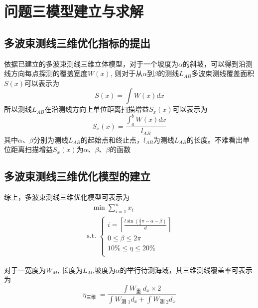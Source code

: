 \documentclass[withoutpreface,bwprint]{cumcmthesis} %
\begin{document}
    \section{问题三模型建立与求解}
    \subsection{多波束测线三维优化指标的提出}
    依据已建立的多波束测线三维立体模型，对于一个坡度为$\alpha$的斜坡，可以得到沿测线方向每点探测的覆盖宽度$W(x)$, 则对于从$\alpha$到$\beta$的测线$L_{AB}$多波束测线覆盖面积$S(x)$可以表示为
    \begin{equation}
        S(x)=\int W(x) d x
    \end{equation}
    所以测线$L_{AB}$在沿测线方向上单位距离扫描增益$S_x(x)$可以表示为
    \begin{equation}
        S_x(x)=\frac{\int_a^b W(x) d x}{l_{AB}}
    \end{equation}
   其中$\alpha$、$\beta$分别为测线$L_{AB}$的起始点和终止点，$l_{AB}$为测线$L_{AB}$的长度。不难看出单位距离扫描增益$S_x(x)$为$\alpha$、$\beta$、$\beta$的函数
  

   
   \subsection{多波束测线三维优化模型的建立}
   综上，多波束测线三维优化模型可表示为
   \begin{gather}
       \quad \min\sum_{i=1}^{n} x_{i} \\
       \text { s.t. }\left\{\begin{array}{l}
           i=\left\lceil\frac{l \sin \left(\frac{3}{2} \pi-\alpha-\beta\right)}{d}\right\rceil \\
           0 \leq \beta \leq 2 \pi\\
               10\% \leq \eta \leq 20\%                    \\	
       \end{array}\right.
   \end{gather}

   对于一宽度为$W_M$, 长度为$L_M$,坡度为$\alpha$的举行待测海域，其三维测线覆盖率可表示为
   \begin{equation}
   \eta_{\text {三维 }}=\frac{\int W_{\text {重 }} d_x \times 2}{\int W_{\text {测 } 1} d_x+\int W_{\text {测 } 2} d_x}
\end{equation}
\end{document}
